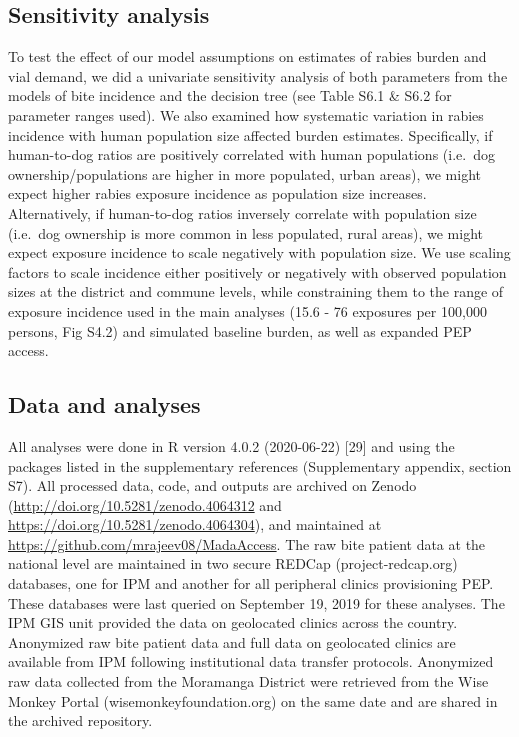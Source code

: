 \documentclass[
]{book}
\begin{document}
\hypertarget{sensitivity-analysis}{%
\subsection{Sensitivity analysis}\label{sensitivity-analysis}}

To test the effect of our model assumptions on estimates of rabies
burden and vial demand, we did a univariate sensitivity analysis of both
parameters from the models of bite incidence and the decision tree (see
Table S6.1 \& S6.2 for parameter ranges used). We also examined how
systematic variation in rabies incidence with human population size
affected burden estimates. Specifically, if human-to-dog ratios are
positively correlated with human populations (i.e.~dog
ownership/populations are higher in more populated, urban areas), we
might expect higher rabies exposure incidence as population size
increases. Alternatively, if human-to-dog ratios inversely correlate
with population size (i.e.~dog ownership is more common in less
populated, rural areas), we might expect exposure incidence to scale
negatively with population size. We use scaling factors to scale
incidence either positively or negatively with observed population sizes
at the district and commune levels, while constraining them to the range
of exposure incidence used in the main analyses (15.6 - 76 exposures per
100,000 persons, Fig S4.2) and simulated baseline burden, as well as
expanded PEP access.

\hypertarget{data-and-analyses-1}{%
\subsection{Data and analyses}\label{data-and-analyses-1}}

All analyses were done in R version 4.0.2 (2020-06-22) {[}29{]} and using
the packages listed in the supplementary references (Supplementary
appendix, section S7). All processed data, code, and outputs are
archived on Zenodo (\url{http://doi.org/10.5281/zenodo.4064312} and
\url{https://doi.org/10.5281/zenodo.4064304}), and maintained at
\url{https://github.com/mrajeev08/MadaAccess}. The raw bite patient data at
the national level are maintained in two secure REDCap
(project-redcap.org) databases, one for IPM and another for all
peripheral clinics provisioning PEP. These databases were last queried
on September 19, 2019 for these analyses. The IPM GIS unit provided the
data on geolocated clinics across the country. Anonymized raw bite
patient data and full data on geolocated clinics are available from IPM
following institutional data transfer protocols. Anonymized raw data
collected from the Moramanga District were retrieved from the Wise
Monkey Portal (wisemonkeyfoundation.org) on the same date and are shared
in the archived repository.
\end{document}
